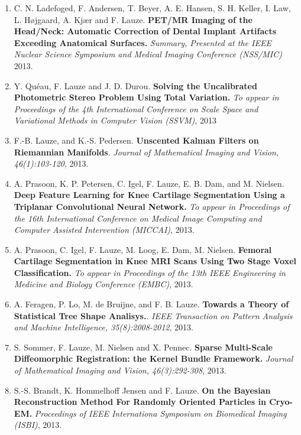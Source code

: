\documentclass[10pt]{article}
\begin{document}
\begin{description}
\begin{enumerate}
  \item C. N. Ladefoged, F. Andersen, T. Beyer, A. E. Hansen, S. H. Keller, I. Law,
    L. H{\o}jgaard, A. Kj{\ae}r and F. Lauze.  \textbf{ PET/MR Imaging of the Head/Neck:
      Automatic Correction of Dental Implant Artifacts Exceeding Anatomical Surfaces.  }
    \textit{Summary, Presented at the IEEE Nuclear Science Symposium and Medical Imaging
      Conference (NSS/MIC)} 2013.

  \item Y. Qu{\'e}au, F. Lauze and J. D. Durou.  \textbf{ Solving the Uncalibrated
      Photometric Stereo Problem Using Total Variation.  }\textit{To appear in Proceedings
      of the 4th International Conference on Scale Space and Variational Methods in
      Computer Vision (SSVM)}, 2013

  \item F.-B. Lauze, and K.-S. Pedersen.  \textbf{Unscented Kalman Filters on Riemannian
      Manifolds}.  \textit{Journal of Mathematical Imaging and Vision, 46(1):103-120},
    2013.

  \item A. Prasoon, K. P. Petersen, C. Igel, F. Lauze, E. B. Dam, and M. Nielsen.
    \textbf{ Deep Feature Learning for Knee Cartilage Segmentation Using a Triplanar
      Convolutional Neural Network.  }\textit{ To appear in Proceedings of the 16th
      International Conference on Medical Image Computing and Computer Assisted
      Intervention (MICCAI)}, 2013.

  \item A. Prasoon, C. Igel, F. Lauze, M. Loog, E. Dam, M. Nielsen.  \textbf{ Femoral
      Cartilage Segmentation in Knee MRI Scans Using Two Stage Voxel Classification.
    }\textit{To appear in Proceedings of the 13th IEEE Engineering in Medicine and Biology
      Conference (EMBC)}, 2013.

  \item A. Feragen, P. Lo, M. de Bruijne, and F. B. Lauze.  \textbf{Towards a Theory of
      Statistical Tree Shape Analisys.}.  \textit{IEEE Transaction on Pattern Analysis and
      Machine Intelligence, 35(8):2008-2012}, 2013.

  \item S. Sommer, F. Lauze, M. Nielsen and X. Pennec.  \textbf{Sparse Multi-Scale
      Diffeomorphic Registration: the Kernel Bundle Framework.  }\textit{ Journal of
      Mathematical Imaging and Vision, 46(3):292-308}, 2013.

  \item S.-S. Brandt, K. Hommelhoff Jensen and F. Lauze.  \textbf{On the Bayesian
      Reconstruction Method For Randomly Oriented Particles in Cryo-EM.  } \textit{
      Proceedings of IEEE Internationa Symposium on Biomedical Imaging (ISBI)}, 2013.
  \end{enumerate}


\end{description}
\end{document}

